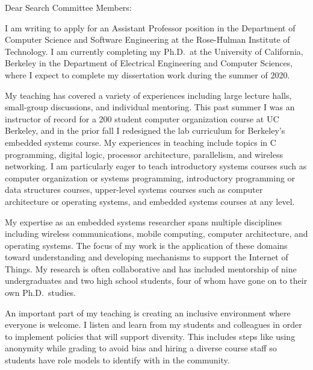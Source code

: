 \documentclass{letter}
\begin{document}
\begin{letter}{}
\date{}

\opening{Dear Search Committee Members:}

I am writing to apply for an
Assistant Professor
position in the
Department of Computer Science and Software Engineering
at the
Rose-Hulman Institute of Technology.
%
I am currently completing my Ph.D.\ at the University of California, Berkeley
in the Department of Electrical Engineering and Computer Sciences, where I
expect to complete my dissertation work during the summer of 2020.

My teaching has covered a variety of experiences including
large lecture halls, small-group discussions, and individual mentoring.
%
This past summer I was an instructor of record for a 200 student computer
organization course at UC Berkeley, and in the prior fall I redesigned the lab
curriculum for Berkeley's embedded systems course.
%
My experiences in teaching include topics in C programming, digital logic,
processor architecture, parallelism, and wireless networking.
%
%
I am particularly eager to teach
introductory systems courses such as computer organization or systems programming,
introductory programming or data structures courses,
upper-level systems courses such as computer architecture or operating systems,
and embedded systems courses at any level.

My expertise as an embedded systems researcher spans multiple disciplines
including wireless communications, mobile computing, computer architecture, and
operating systems.
%
The focus of my work is the application of these domains toward understanding
and developing mechanisms to support the Internet of Things.
%
My research is often collaborative and has included mentorship of nine
undergraduates and two high school students, four of whom have gone on to
their own Ph.D.\ studies.


An important part of my teaching is creating an inclusive environment where
everyone is welcome. I listen and learn from my students and colleagues
in order to implement policies that will support diversity.
%
This includes steps like using anonymity while grading to avoid bias and hiring
a diverse course staff so students have role models to identify with in the community.


\end{letter}
\end{document}
